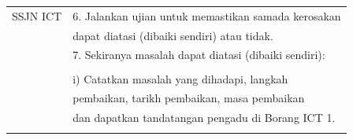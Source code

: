 \documentclass[
]{article}
\begin{document}
\begin{longtable}[]{@{}ll@{}}
\begin{minipage}[t]{0.23\columnwidth}
SSJN ICT\strut
\end{minipage} & \begin{minipage}[t]{0.71\columnwidth}\raggedright
6. Jalankan ujian untuk memastikan samada kerosakan\strut
\end{minipage}\tabularnewline
\begin{minipage}[t]{0.23\columnwidth}\raggedright
\strut
\end{minipage} & \begin{minipage}[t]{0.71\columnwidth}\raggedright
dapat diatasi (dibaiki sendiri) atau tidak.\strut
\end{minipage}\tabularnewline
\begin{minipage}[t]{0.23\columnwidth}\raggedright
\strut
\end{minipage} & \begin{minipage}[t]{0.71\columnwidth}\raggedright
7. Sekiranya masalah dapat diatasi (dibaiki sendiri):\strut
\end{minipage}\tabularnewline
\begin{minipage}[t]{0.23\columnwidth}\raggedright
\strut
\end{minipage} & \begin{minipage}[t]{0.71\columnwidth}\raggedright
\strut
\end{minipage}\tabularnewline
\begin{minipage}[t]{0.23\columnwidth}\raggedright
\strut
\end{minipage} & \begin{minipage}[t]{0.71\columnwidth}\raggedright
i) Catatkan masalah yang dihadapi, langkah\strut
\end{minipage}\tabularnewline
\begin{minipage}[t]{0.23\columnwidth}\raggedright
\strut
\end{minipage} & \begin{minipage}[t]{0.71\columnwidth}\raggedright
pembaikan, tarikh pembaikan, masa pembaikan\strut
\end{minipage}\tabularnewline
\begin{minipage}[t]{0.23\columnwidth}\raggedright
\strut
\end{minipage} & \begin{minipage}[t]{0.71\columnwidth}\raggedright
dan dapatkan tandatangan pengadu di Borang ICT 1.\strut
\end{minipage}\tabularnewline
\begin{minipage}[t]{0.23\columnwidth}\raggedright
\strut
\end{minipage} & \begin{minipage}[t]{0.71\columnwidth}\raggedright

\end{minipage}
\end{longtable}
\end{document}
